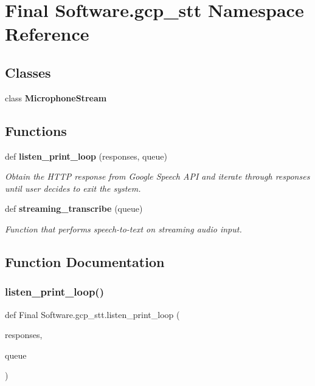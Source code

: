 \section{Final Software.\+gcp\+\_\+stt Namespace Reference}
\label{namespace_final_01_software_1_1gcp__stt}
\subsection*{Classes}
\begin{DoxyCompactItemize}
\item 
class \textbf{ Microphone\+Stream}
\end{DoxyCompactItemize}
\subsection*{Functions}
\begin{DoxyCompactItemize}
\item 
def \textbf{ listen\+\_\+print\+\_\+loop} (responses, queue)
\begin{DoxyCompactList}\small\item\em Obtain the H\+T\+TP response from Google Speech A\+PI and iterate through responses until user decides to exit the system. \end{DoxyCompactList}\item 
def \textbf{ streaming\+\_\+transcribe} (queue)
\begin{DoxyCompactList}\small\item\em Function that performs speech-\/to-\/text on streaming audio input. \end{DoxyCompactList}\end{DoxyCompactItemize}


\subsection{Function Documentation}
\mbox{\label{namespace_final_01_software_1_1gcp__stt_aea2255a6e43ca4fce106e4a000da7df9}} 
\subsubsection{listen\_print\_loop()}
{\footnotesize\ttfamily def Final Software.\+gcp\+\_\+stt.\+listen\+\_\+print\+\_\+loop (\begin{DoxyParamCaption}\item[{}]{responses,  }\item[{}]{queue }\end{DoxyParamCaption})}



